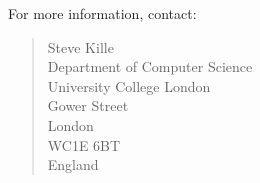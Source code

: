 For more information, contact:
\begin{quote}
Steve Kille \\
Department of Computer Science \\
University College London \\
Gower Street \\
London \\
WC1E 6BT \\
England \\
\end{quote}

